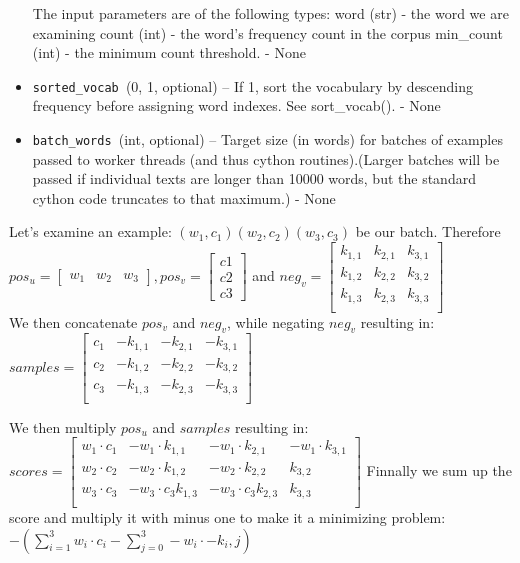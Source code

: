 \begin{itemize}
    The input parameters are of the following types:
            word (str) - the word we are examining
            count (int) - the word’s frequency count in the corpus
            min\_count (int) - the minimum count threshold. - None

  \item  \texttt{sorted\_vocab }({0, 1}, optional) – If 1, sort the vocabulary by descending frequency before assigning word indexes. See sort\_vocab(). - None
 \item   \texttt{batch\_words }(int, optional) – Target size (in words) for batches of examples passed to worker threads (and thus cython routines).(Larger batches will be passed if individual texts are longer than 10000 words, but the standard cython code truncates to that maximum.) - None 
\end{itemize}

Let's examine an example: $(w_1,c_1)(w_2,c_2)(w_3,c_3)$ be our batch. 
Therefore $pos_u = \begin{bmatrix}
w_1 & w_2 & w_3
\end{bmatrix}, pos_v = \begin{bmatrix}
c1\\
c2\\
c3\end{bmatrix}$ and $neg_v = 
\begin{bmatrix}
k_{1,1} & k_{2,1} & k_{3,1}\\
k_{1,2} & k_{2,2} & k_{3,2}\\
k_{1,3} & k_{2,3} & k_{3,3}\\
\end{bmatrix}$\\
 We then concatenate $pos_v$ and $neg_v$, while negating $neg_v$
resulting in: \\
$samples = \begin{bmatrix}
c_1 & -k_{1,1} & -k_{2,1} & - k_{3,1}\\
c_2 &- k_{1,2} & -k_{2,2} & -k_{3,2}\\
c_3 & -k_{1,3} & -k_{2,3}& - k_{3,3}\\
\end{bmatrix}$

We then multiply $pos_u$ and $samples$ resulting in: \\
$scores = \begin{bmatrix}
w_1 \cdot c_1 & -w_1 \cdot k_{1,1} & -w_1 \cdot  k_{2,1} & -w_1 \cdot  k_{3,1}\\
w_2 \cdot c_2 & -w_2 \cdot k_{1,2} & -w_2 \cdot k_{2,2} & k_{3,2}\\
w_3 \cdot c_3 &-w_3 \cdot c_3  k_{1,3} & -w_3 \cdot c_3 k_{2,3}& k_{3,3}\\
\end{bmatrix}$
Finnally we sum up the score and multiply it with minus one to make it a minimizing problem: \\
 $-(\sum_{i=1}^3 w_i \cdot c_i - \sum_{j=0}^3 -w_i \cdot -k_i,j)$